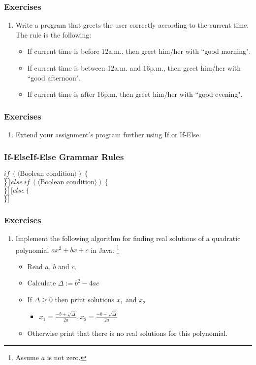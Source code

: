 \documentclass{beamer}
\newcommand{\cindent}{\hskip20pt}
\begin{document}
	\begin{frame}
		\frametitle{Exercises}
		\begin{enumerate}
			\item Write a program that greets the user correctly according to the current time. The rule is the following:
			\begin{itemize}
				\item If current time is before 12a.m., then greet him/her with ``good morning".
				\item If current time is between 12a.m. and 16p.m., then greet him/her with ``good afternoon".
				\item If current time is after 16p.m, then greet him/her with ``good evening".
			\end{itemize}
		\end{enumerate}
	\end{frame}

	\begin{frame}
		\frametitle{Exercises}
		\begin{enumerate}[2]
			\item Extend your assignment's program further using If or If-Else.
		\end{enumerate}
	\end{frame}

	\begin{frame}
		\frametitle{If-ElseIf-Else Grammar Rules}
		$if\ (\langle \text{Boolean condition} \rangle)\ \{$\\
		\cindent $...$\\
		$\}\ [else\ if\ (\langle \text{Boolean condition} \rangle) \ \{$\\
		\cindent $...$\\
		$\}]\ [else\ \{$\\
		\cindent $...$\\
		$\}]$\\
	\end{frame}

	\begin{frame}
		\frametitle{Exercises}
		\begin{enumerate}
			\item Implement the following algorithm for finding real solutions of a quadratic polynomial $ax^2 + bx + c$ in Java. \footnote{Assume $a$ is not zero.}
			\begin{itemize}
				\item Read $a$, $b$ and $c$.
				\item Calculate $\Delta := b^2 - 4ac$
				\item If $\Delta \ge 0$ then print solutions $x_1$ and $x_2$
				\begin{itemize}
					\item $x_1 = \frac{-b + \sqrt{\Delta}}{2a}, x_2 = \frac{-b - \sqrt{\Delta}}{2a}$
				\end{itemize}
				\item Otherwise print that there is no real solutions for this polynomial.
			\end{itemize}
		\end{enumerate}
	\end{frame}
\end{document}
